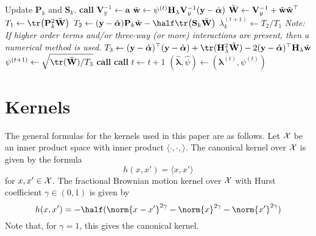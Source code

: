 \documentclass[english, 11pt]{article}
\begin{document}
\begin{algorithm}[H]
\begin{algorithmic}[1]
    \State Update $\mathbf P_k$ and $\mathbf S_k$. 
\EndProcedure	
\Statex
{}
		\State \textbf{call}  
		\State $\mathbf V_y^{-1} \gets \mathbf a$
		\State $\tilde{\mathbf w} \gets \psi^{(t)} \mathbf H_\lambda \mathbf V_y^{-1}(\mathbf y - \hat{\boldsymbol\alpha})$
		\State $\tilde{\mathbf W} \gets \mathbf V_y^{-1} + \tilde{\mathbf w}\tilde{\mathbf w}^\top$
	\EndProcedure
	\Statex
		\State $T_1 \gets \tr\big(\mathbf P_k^2 \Wtilde\big)$
		\State $T_2 \gets (\mathbf y - \hat{\boldsymbol\alpha})\mathbf P_k \wtilde - \half\tr\big(\mathbf S_k\Wtilde\big)$ 
		\State $\lambda_k^{(t+1)} \gets T_2/T_1$
	\EndFor
	\EndProcedure
	\State \textit{Note: If higher order terms and/or three-way (or more) interactions are present, then a numerical method is used.}
	\Statex
	 
    	\State $T_3 \gets (\mathbf y - \hat{\boldsymbol\alpha})^\top(\mathbf y - \hat{\boldsymbol\alpha}) + \tr(\mathbf H_\lambda^2 \Wtilde) - 2(\mathbf y - \hat{\boldsymbol\alpha})^\top\mathbf H_\lambda\wtilde$
    	\State $\psi^{(t+1)} \gets \sqrt{\tr(\Wtilde)/T_3}$ 
	\EndProcedure
	\Statex
	\State \textbf{call} 
	\State \textbf{call} 
	\State $t \gets t+1$
\EndWhile
\Statex
\State $(\hat{\boldsymbol\lambda}, \hat{\psi}) \gets (\boldsymbol\lambda^{(t)}, \psi^{(t)})$ 
\end{algorithmic}
\end{algorithm}

\section{Kernels}
\label{apx:kern}

The general formulas for the kernels used in this paper are as follows. Let $\cal X$ be an inner product space with inner product $\langle\cdot,\cdot,\rangle$. The canonical kernel over $\cal X$ is given by the formula
\[  h(x,x') = \langle x,x'\rangle \]
for $x,x'\in\cal X$.
The fractional Brownian motion kernel over $\cal X$ with Hurst coefficient $\gamma\in(0,1)$ is given by
\[  h(x,x') = -\half(\norm{x-x'}^{2\gamma} - \norm{x}^{2\gamma} - \norm{x'}^{2\gamma} ) \] 
Note that, for $\gamma=1$, this gives the canonical kernel. 
\end{document}
